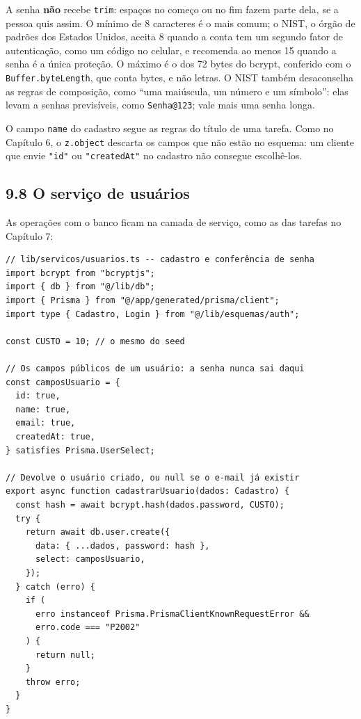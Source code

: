 A senha \textbf{não} recebe \texttt{trim}: espaços no começo ou no fim fazem parte dela, se a pessoa quis assim. O mínimo de 8 caracteres é o mais comum; o NIST, o órgão de padrões dos Estados Unidos, aceita 8 quando a conta tem um segundo fator de autenticação, como um código no celular, e recomenda ao menos 15 quando a senha é a única proteção. O máximo é o dos 72 bytes do bcrypt, conferido com o \texttt{Buffer.byteLength}, que conta bytes, e não letras. O NIST também desaconselha as regras de composição, como ``uma maiúscula, um número e um símbolo'': elas levam a senhas previsíveis, como \texttt{Senha@123}; vale mais uma senha longa.

O campo \texttt{name} do cadastro segue as regras do título de uma tarefa. Como no Capítulo 6, o \texttt{z.object} descarta os campos que não estão no esquema: um cliente que envie \texttt{"id"} ou \texttt{"createdAt"} no cadastro não consegue escolhê-los.

\subsection{9.8 O serviço de usuários}

As operações com o banco ficam na camada de serviço, como as das tarefas no Capítulo 7:

\begin{codigo}
\begin{Verbatim}[breaklines=true, breaksymbolleft={}, fontsize=\footnotesize]
// lib/servicos/usuarios.ts -- cadastro e conferência de senha
import bcrypt from "bcryptjs";
import { db } from "@/lib/db";
import { Prisma } from "@/app/generated/prisma/client";
import type { Cadastro, Login } from "@/lib/esquemas/auth";

const CUSTO = 10; // o mesmo do seed

// Os campos públicos de um usuário: a senha nunca sai daqui
const camposUsuario = {
  id: true,
  name: true,
  email: true,
  createdAt: true,
} satisfies Prisma.UserSelect;

// Devolve o usuário criado, ou null se o e-mail já existir
export async function cadastrarUsuario(dados: Cadastro) {
  const hash = await bcrypt.hash(dados.password, CUSTO);
  try {
    return await db.user.create({
      data: { ...dados, password: hash },
      select: camposUsuario,
    });
  } catch (erro) {
    if (
      erro instanceof Prisma.PrismaClientKnownRequestError &&
      erro.code === "P2002"
    ) {
      return null;
    }
    throw erro;
  }
}
\end{Verbatim}
\end{codigo}


